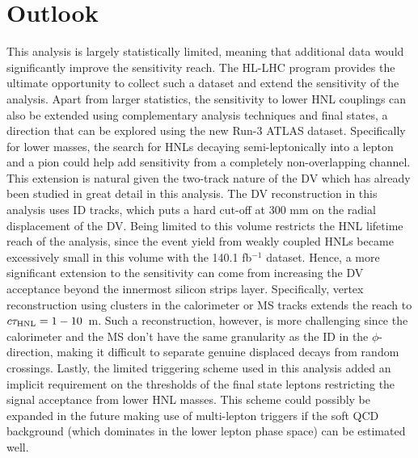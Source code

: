 \section*{Outlook}
This analysis is largely statistically limited, meaning that additional data would significantly improve the sensitivity reach. The HL-LHC program provides the ultimate opportunity to collect such a dataset and extend the sensitivity of the analysis. Apart from larger statistics, the sensitivity to lower HNL couplings can also be extended using complementary analysis techniques and final states, a direction that can be explored using the new Run-3 ATLAS dataset. Specifically for lower masses, the search for HNLs decaying semi-leptonically into a lepton and a pion could help add sensitivity from a completely non-overlapping channel. This extension is natural given the two-track nature of the DV which has already been studied in great detail in this analysis. The DV reconstruction in this analysis uses ID tracks, which puts a hard cut-off at 300 mm on the radial displacement of the DV. Being limited to this volume restricts the HNL lifetime reach of the analysis, since the event yield from weakly coupled HNLs became excessively small in this volume with the 140.1 fb$^{-1}$ dataset. Hence, a more significant extension to the sensitivity can come from increasing the DV acceptance beyond the innermost silicon strips layer. Specifically, vertex reconstruction using clusters in the calorimeter or MS tracks extends the reach to $c\tau_\mathrm{HNL}=1-10$~m. Such a reconstruction, however, is more challenging since the calorimeter and the MS don't have the same granularity as the ID in the $\phi$-direction, making it difficult to separate genuine displaced decays from random crossings. Lastly, the limited triggering scheme used in this analysis added an implicit requirement on the \pT thresholds of the final state leptons restricting the signal acceptance from lower HNL masses. This scheme could possibly be expanded in the future making use of multi-lepton triggers if the soft QCD background (which dominates in the lower lepton \pT phase space) can be estimated well.